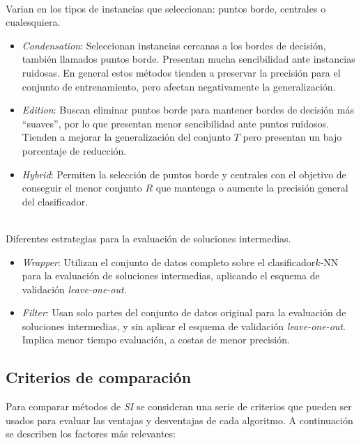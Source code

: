 \\
Varian en los tipos de instancias que seleccionan: puntos borde, centrales o cualesquiera.
\begin{itemize}
\item \emph{Condensation}:
Seleccionan instancias cercanas a los bordes de decisión, también llamados puntos borde. Presentan mucha sencibilidad ante instancias ruidosas. En general estos métodos tienden a preservar la precisión para el conjunto de entrenamiento, pero afectan negativamente la generalización.
\item \emph{Edition}:
Buscan eliminar puntos borde para mantener bordes de decisión más ``suaves'', por lo que presentan menor sencibilidad ante puntos ruidosos. Tienden a mejorar la generalización del conjunto $T$ pero presentan un bajo porcentaje de reducción.
\item \emph{Hybrid}:
Permiten la selección de puntos borde y centrales con el objetivo de conseguir el menor conjunto $R$ que mantenga o aumente la precisión general del clasificador.
\end{itemize}

\\
Diferentes estrategias para la evaluación de soluciones intermedias.
\begin{itemize}
\item \emph{Wrapper}:
Utilizan el conjunto de datos completo sobre el clasificador\linebreak$k$-NN para la evaluación de soluciones intermedias, aplicando el esquema de validación \emph{leave-one-out}.
\item \emph{Filter}:
Usan solo partes del conjunto de datos original para la evaluación de soluciones intermedias, y sin aplicar el esquema de validación \emph{leave-one-out}. Implica menor tiempo evaluación, a costas de menor precisión.
\end{itemize}

\subsection{Criterios de comparación}

Para comparar métodos de \emph{SI} se consideran una serie de criterios que pueden ser usados para evaluar las ventajas y desventajas de cada algoritmo. A continuación se describen los factores más relevantes:

